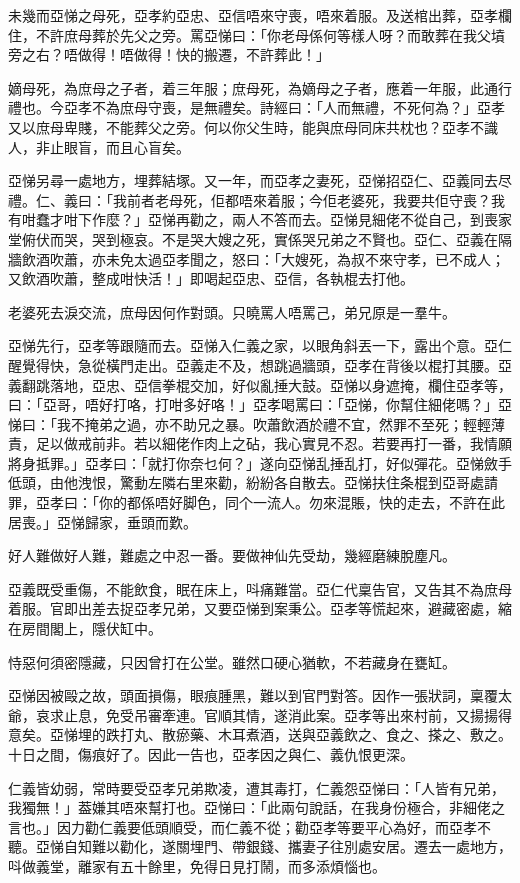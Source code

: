 \documentclass[a5paper, 12pt, openany]{book} %
\begin{document}
	未幾而亞悌之母死，亞孝約亞忠、亞信唔來守喪，唔來着服。及送棺出葬，亞孝欄住，不許庶母葬於先父之旁。罵亞悌曰：「你老母係何等樣人呀？而敢葬在我父墳旁之右？唔做得！唔做得！快的搬遷，不許葬此！」

	嫡母死，為庶母之子者，着三年服；庶母死，為嫡母之子者，應着一年服，此通行禮也。今亞孝不為庶母守喪，是無禮矣。詩經曰：「人而無禮，不死何為？」亞孝又以庶母卑賤，不能葬父之旁。何以你父生時，能與庶母同床共枕也？亞孝不識人，非止眼盲，而且心盲矣。

	亞悌另尋一處地方，埋葬結塚。又一年，而亞孝之妻死，亞悌招亞仁、亞義同去尽禮。仁、義曰：「我前者老母死，佢都唔來着服；今佢老婆死，我要共佢守喪？我有咁蠢才咁下作麼？」亞悌再勸之，兩人不答而去。亞悌見細佬不從自己，到喪家堂俯伏而哭，哭到極哀。不是哭大嫂之死，實係哭兄弟之不賢也。亞仁、亞義在隔牆飲酒吹蕭，亦未免太過亞孝聞之，怒曰：「大嫂死，為叔不來守孝，已不成人；又飲酒吹蕭，整成咁快活！」即喝起亞忠、亞信，各執棍去打他。

	老婆死去淚交流，庶母因何作對頭。只曉罵人唔罵己，弟兄原是一羣牛。

	亞悌先行，亞孝等跟隨而去。亞悌入仁義之家，以眼角斜丟一下，露出个意。亞仁醒覺得快，急從橫門走出。亞義走不及，想跳過牆頭，亞孝在背後以棍打其腰。亞義翻跳落地，亞忠、亞信拳棍交加，好似亂捶大鼓。亞悌以身遮掩，欄住亞孝等，曰：「亞哥，唔好打咯，打咁多好咯！」亞孝喝罵曰：「亞悌，你幫住細佬嗎？」亞悌曰：「我不掩弟之過，亦不助兄之暴。吹蕭飲酒於禮不宜，然罪不至死；輕輕薄責，足以做戒前非。若以細佬作肉上之砧，我心實見不忍。若要再打一番，我情願將身抵罪。」亞孝曰：「就打你奈乜何？」遂向亞悌乱捶乱打，好似彈花。亞悌斂手低頭，由他洩恨，驚動左隣右里來勸，紛紛各自散去。亞悌扶住条棍到亞哥處請罪，亞孝曰：「你的都係唔好脚色，同个一流人。勿來混賬，快的走去，不許在此居喪。」亞悌歸家，垂頭而歎。

	好人難做好人難，難處之中忍一番。要做神仙先受劫，幾經磨練脫塵凡。

	亞義既受重傷，不能飲食，眠在床上，呌痛難當。亞仁代稟告官，又告其不為庶母着服。官即出差去捉亞孝兄弟，又要亞悌到案秉公。亞孝等慌起來，避藏密處，縮在房間閣上，隱伏缸中。

	恃惡何須密隱藏，只因曾打在公堂。雖然口硬心猶軟，不若藏身在甕缸。

	亞悌因被毆之故，頭面損傷，眼痕腫黑，難以到官門對答。因作一張狀詞，稟覆太爺，哀求止息，免受吊審牽連。官順其情，遂消此案。亞孝等出來村前，又揚揚得意矣。亞悌埋的跌打丸、散瘀藥、木耳煮酒，送與亞義飲之、食之、搽之、敷之。十日之間，傷痕好了。因此一告也，亞孝因之與仁、義仇恨更深。

	仁義皆幼弱，常時要受亞孝兄弟欺凌，遭其毒打，仁義怨亞悌曰：「人皆有兄弟，我獨無！」葢嫌其唔來幫打也。亞悌曰：「此兩句說話，在我身份極合，非細佬之言也。」因力勸仁義要低頭順受，而仁義不從；勸亞孝等要平心為好，而亞孝不聽。亞悌自知難以勸化，遂關埋門、帶銀錢、攜妻子往別處安居。遷去一處地方，呌做義堂，離家有五十餘里，免得日見打鬧，而多添煩惱也。
\end{document}
